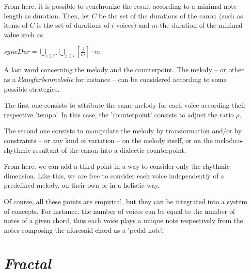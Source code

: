 From here, it is possible to synchronize the result according to a minimal note length as duration. Then, let $C$ be the set of the durations of the canon (such as items of $C$ is the set of durations of $i$ voices) and $m$ the duration of the minimal value such as

\bigskip

$syncDur = \displaystyle \bigcup\limits_{i \in C} \bigcup\limits_{j \in i} \displaystyle \left [ \frac{j}{m} \right ] \cdot m$
 
\bigskip 
\bigskip
 
 A last word concerning the melody and the counterpoint. The melody -- or other as a \textit{klangfarbenmelodie} for instance -- can be considered according to some possible strategies.

The first one consists to attribute the same melody for each voice according their respective 'tempo'. In this case, the 'counterpoint' consists to adjust the ratio $\rho$.

The second one consists to manipulate the melody by transformation and/or by constraints -- or any kind of variation -- on the melody itself, or on the melodico-rhythmic resultant of the canon into a dialectic counterpoint. 

From here, we can add a third point in a way to consider only the rhythmic dimension. Like this, we are free to consider each voice independently of a predefined melody, on their own or in a holistic way.

Of course, all these points are empirical, but they can be integrated into a system of concepts.
For instance, the number of voices can be equal to the number of notes of a given chord, thus each voice plays a unique note respectively from the notes composing the aforesaid chord as a 'pedal note'.


\section{\textsl{Fractal}}
\label{imp3}


